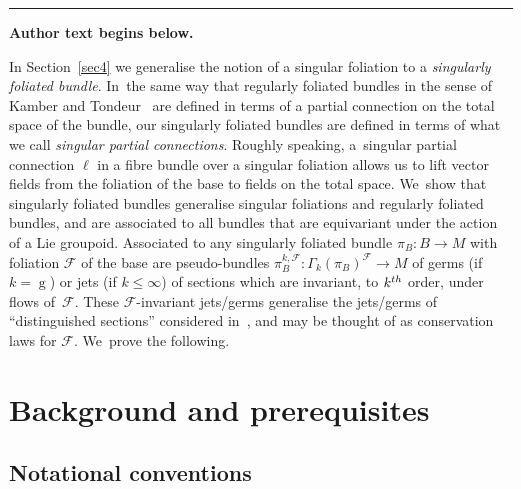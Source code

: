 \documentclass[11pt]{article}
\numberwithin{equation}{section}
\numberwithin{equation}{section}
\def\g{\operatorname{g}}
\def\FF{{\mathcal{F}}}
\begin{document}
\medskip\hrule\medskip\noindent\textbf{Author text begins below.}\par
\setcounter{section}{1}
In Section~\ref{sec4} we generalise the notion of a singular foliation to a \textit{singularly foliated bundle}. In~the same way that regularly foliated bundles in the sense of Kamber and Tondeur~\cite{folbund} are defined in terms of a partial connection on the total space of the bundle, our singularly foliated bundles are defined in terms of what we call \textit{singular partial connections}. Roughly speaking, a~singular partial connection $\ell$ in a fibre bundle over a singular foliation allows us to lift vector fields from the foliation of the base to fields on the total space. We~show that singularly foliated bundles generalise singular foliations and regularly foliated bundles, and are associated to all bundles that are equivariant under the action of a Lie groupoid. Associated to any singularly foliated bundle $\pi_{B}\colon B\rightarrow M$ with foliation $\FF$ of the base are pseudo-bundles $\pi_{B}^{k,\FF}\colon \Gamma_{k}(\pi_{B})^{\FF}\rightarrow M$ of germs (if~$k=\g$) or jets (if $k\leq\infty$) of sections which are invariant, to $k^{\rm th}$ order, under flows of~$\FF$. These $\FF$-invariant jets/germs generalise the jets/germs of ``distinguished sections'' considered in~\cite{mac3}, and may be thought of as conservation laws for $\FF$. We~prove the following.

\setcounter{section}{1}
\section{Background and prerequisites}\label{sec2}

\subsection{Notational conventions}
\end{document}
